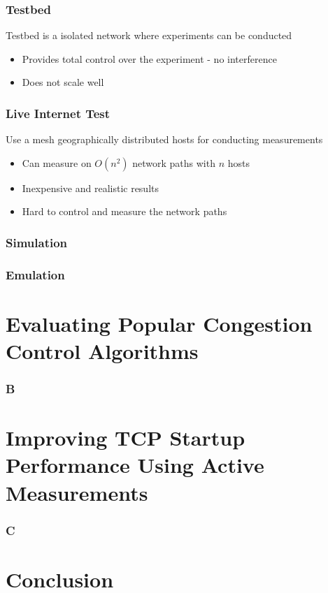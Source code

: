 \documentclass{beamer}
\begin{document}
\begin{frame}
\frametitle{Testbed}
Testbed is a isolated network where experiments can be conducted
\begin{itemize}
	\item Provides total control over the experiment - no interference
	\item Does not scale well
\end{itemize}

\end{frame}

\begin{frame}
\frametitle{Live Internet Test}
Use a mesh geographically distributed hosts for conducting measurements
\begin{itemize}
	\item Can measure on $O(n^2)$ network paths with $n$ hosts
	\item Inexpensive and realistic results
	\item Hard to control and measure the network paths 
\end{itemize}

\end{frame}

\begin{frame}
\frametitle{Simulation}

\end{frame}

\begin{frame}
\frametitle{Emulation}

\end{frame}

\section{Evaluating Popular Congestion Control Algorithms}

\begin{frame}
\frametitle{B}

\end{frame}

\section{Improving TCP Startup Performance Using Active Measurements}

\begin{frame}
\frametitle{C}

\end{frame}

\section{Conclusion}
\end{document}
